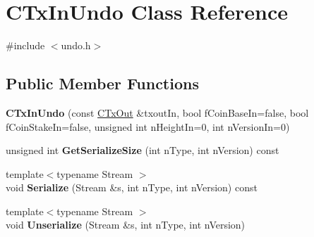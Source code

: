 \hypertarget{class_c_tx_in_undo}{}\section{C\+Tx\+In\+Undo Class Reference}
\label{class_c_tx_in_undo}


{\ttfamily \#include $<$undo.\+h$>$}

\subsection*{Public Member Functions}
\begin{DoxyCompactItemize}
\item 
\mbox{\label{class_c_tx_in_undo_ae3cdf8e4de3eae7518d63b9b669d4040}} 
{\bfseries C\+Tx\+In\+Undo} (const \mbox{\hyperlink{class_c_tx_out}{C\+Tx\+Out}} \&txout\+In, bool f\+Coin\+Base\+In=false, bool f\+Coin\+Stake\+In=false, unsigned int n\+Height\+In=0, int n\+Version\+In=0)
\item 
\mbox{\label{class_c_tx_in_undo_ae02e42aeabd614a26ba5657f60ec6921}} 
unsigned int {\bfseries Get\+Serialize\+Size} (int n\+Type, int n\+Version) const
\item 
\mbox{\label{class_c_tx_in_undo_a7a4e1cf026b5308fdca471bada9cebaf}} 
{\footnotesize template$<$typename Stream $>$ }\\void {\bfseries Serialize} (Stream \&s, int n\+Type, int n\+Version) const
\item 
\mbox{\label{class_c_tx_in_undo_a0a2b82f03edad7ad85a66e63e4552af9}} 
{\footnotesize template$<$typename Stream $>$ }\\void {\bfseries Unserialize} (Stream \&s, int n\+Type, int n\+Version)
\end{DoxyCompactItemize}

